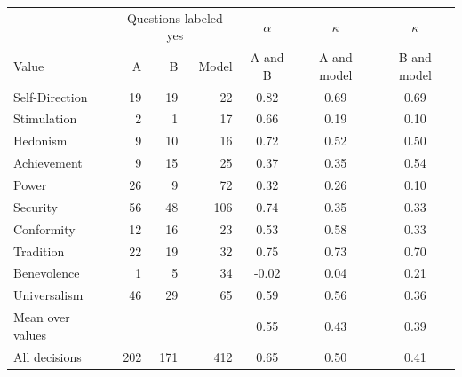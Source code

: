\begin{tabular}{lrrrccc}
\toprule
 & \multicolumn{3}{c}{Questions labeled yes} & $\alpha$ & $\kappa$ & $\kappa$ \\
Value & A & B & Model & A and B & A and model & B and model \\
\midrule
Self-Direction & 19 & 19 & 22 & 0.82 & 0.69 & 0.69 \\
Stimulation & 2 & 1 & 17 & 0.66 & 0.19 & 0.10 \\
Hedonism & 9 & 10 & 16 & 0.72 & 0.52 & 0.50 \\
Achievement & 9 & 15 & 25 & 0.37 & 0.35 & 0.54 \\
Power & 26 & 9 & 72 & 0.32 & 0.26 & 0.10 \\
Security & 56 & 48 & 106 & 0.74 & 0.35 & 0.33 \\
Conformity & 12 & 16 & 23 & 0.53 & 0.58 & 0.33 \\
Tradition & 22 & 19 & 32 & 0.75 & 0.73 & 0.70 \\
Benevolence & 1 & 5 & 34 & -0.02 & 0.04 & 0.21 \\
Universalism & 46 & 29 & 65 & 0.59 & 0.56 & 0.36 \\
\midrule
Mean over values & & & & 0.55 & 0.43 & 0.39 \\
All decisions & 202 & 171 & 412 & 0.65 & 0.50 & 0.41 \\
\bottomrule
\end{tabular}
